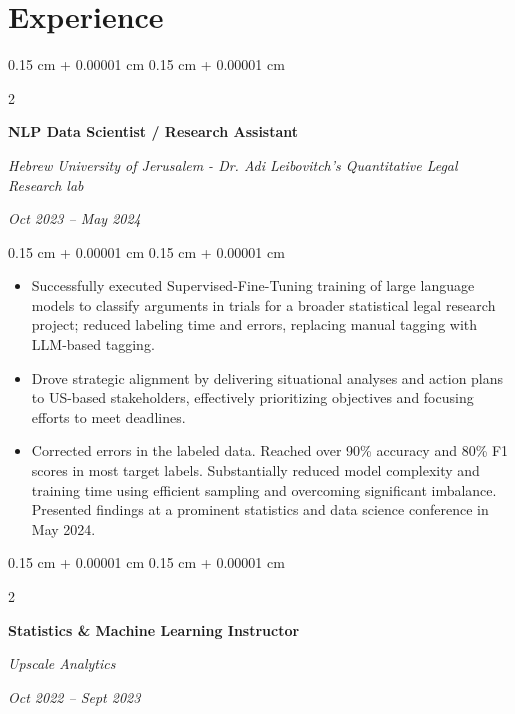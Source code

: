 \documentclass[10pt, letterpaper]{article}
\newenvironment{highlights}{
    \begin{itemize}[
        topsep=0.08 cm,
        parsep=0.08 cm,
        partopsep=0pt,
        itemsep=0pt,
        leftmargin=0.25 cm + 10pt
    ]
}{
    \end{itemize}
} %
\newenvironment{onecolentry}{
    \begin{adjustwidth}{
        0.15 cm + 0.00001 cm
    }{
        0.15 cm + 0.00001 cm
    }
}{
    \end{adjustwidth}
} %
\newenvironment{twocolentry}[2][]{
    \onecolentry
    \def\secondColumn{#2}
    \setcolumnwidth{\fill, 4.5 cm}
    \begin{paracol}{2}
}{
    \switchcolumn \raggedleft \secondColumn
    \end{paracol}
    \endonecolentry
} %
\begin{document}
    \section{Experience}



        
        \begin{twocolentry}{
            
            
        \textit{Oct 2023 – May 2024}}
            \textbf{NLP Data Scientist / Research Assistant}
            
            \textit{Hebrew University of Jerusalem - Dr. Adi Leibovitch's Quantitative Legal Research lab}
        \end{twocolentry}

        \vspace{0.08 cm}
        \begin{onecolentry}
            \begin{highlights}
                \item Successfully executed Supervised-Fine-Tuning training of large language models to classify arguments in trials for a broader statistical legal research project; reduced labeling time and errors, replacing manual tagging with LLM-based tagging.
                \item Drove strategic alignment by delivering situational analyses and action plans to US-based stakeholders, effectively prioritizing objectives and focusing efforts to meet deadlines.
                \item Corrected errors in the labeled data. Reached over 90\% accuracy and 80\% F1 scores in most target labels. Substantially reduced model complexity and training time using efficient sampling and overcoming significant imbalance. Presented findings at a prominent statistics and data science conference in May 2024.
            \end{highlights}
        \end{onecolentry}


        \vspace{0.15 cm}

        \begin{twocolentry}{
            
            
        \textit{Oct 2022 – Sept 2023}}
            \textbf{Statistics \& Machine Learning Instructor}
            
            \textit{Upscale Analytics}
        \end{twocolentry}
\end{document}

